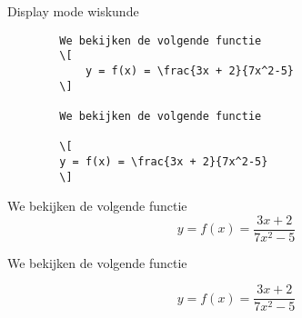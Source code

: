 \begin{frame}[fragile]{Display mode wiskunde}
    
    \begin{verbatim}
        We bekijken de volgende functie
        \[
            y = f(x) = \frac{3x + 2}{7x^2-5}
        \]
        
        We bekijken de volgende functie
        
        \[
        y = f(x) = \frac{3x + 2}{7x^2-5}
        \]
    \end{verbatim}
    
\begin{tcolorbox}[width=11cm, size=small]
        We bekijken de volgende functie
        \[
        y = f(x) = \frac{3x + 2}{7x^2-5}
        \]

        We bekijken de volgende functie

        \[
        y = f(x) = \frac{3x + 2}{7x^2-5}
        \]
\end{tcolorbox}
    
\end{frame}